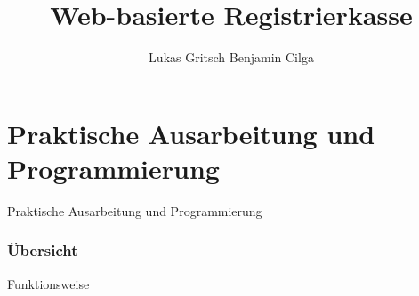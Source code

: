 \documentclass[12pt]{beamer}
\title{Web-basierte Registrierkasse}
\author{Lukas Gritsch Benjamin Cilga}
\begin{document}

\begin{frame}[plain]
\maketitle
\small
\end{frame}

\begin{frame}
	\tableofcontents
\end{frame}


\section{Praktische Ausarbeitung und Programmierung}

\begin{frame}
	\begin{Large}
		\begin{center}
			Praktische Ausarbeitung und Programmierung
		\end{center}
	\end{Large}
\end{frame}


\begin{frame}
\frametitle{Übersicht}
\Large Funktionsweise
\begin{figure}[h]
	\centering
	 \hfill
	
\end{figure}
\end{frame}
\end{document}
